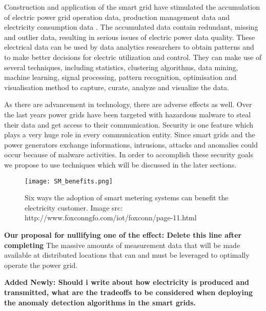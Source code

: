  Construction and application of the smart grid have stimulated the accumulation of electric power grid operation data, production management data and electricity consumption data \cite{chen2016data}. The accumulated data contain redundant, missing and outlier data, resulting in serious issues of electric power data quality.  These electrical data can be used by data analytics researchers to obtain patterns and to make better decisions for electric utilization and control. They can make use of several techniques, including statistics, clustering algorithms, data mining, machine learning, signal processing, pattern recognition, optimisation and visualisation method to capture, curate, analyze and visualize the data. 

As there are advancement in technology, there are adverse effects as well. Over the last years power grids have been targeted with hazardous malware to steal their data and get access to their communication. Security is one feature which plays a very huge role in every communication entity. Since smart grids and the power generators exchange informations, intrusions, attacks and anomalies could occur because of malware activities. In order to accomplish these security goals we propose to use techniques which will be discussed in the later sections.

\begin{figure}
\centerline{\texttt{[image: SM\_benefits.png]}}
    \caption{Six ways the adoption of smart metering systems can benefit the electricity customer. 
    {Image src: http://www.foxconngfo.com/iot/foxconn/page-11.html}}
    \label{fig:SM_Benefits}
\end{figure}


\textbf{Our proposal for nullifying one of the effect: Delete this line after completing}
The massive amounts of measurement data that will be made available at distributed locations that can and must be leveraged to optimally operate the power grid.


\textbf{Added Newly: Should i write about how electricity is produced and transmitted, what are the tradeoffs to be considered when deploying the anomaly detection algorithms in the smart grids. }

